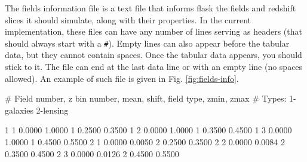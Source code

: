 \documentclass[12pt]{book} %
\newenvironment{alltt}{\ttfamily}{\par}
\begin{document}
The fields information file is a text file that informs {\sc flask} the fields and redshift 
slices it should simulate, along with their properties. In the current implementation, these 
files can have any number of lines serving as headers (that should always start with a {\tt \#}). 
Empty lines can also appear before the tabular data, but they cannot contain spaces. Once 
the tabular data appears, you should stick to it. The file can end at the last data line or 
with an empty line (no spaces allowed). An example of such file is given in Fig. \ref{fig:fields-info}.

\begin{alltt}
\begin{center}
\begin{boxedverbatim}
# Field number, z bin number, mean, shift, field type, zmin, zmax
# Types: 1-galaxies 2-lensing

     1      1   0.0000   1.0000      1   0.2500   0.3500
     1      2   0.0000   1.0000      1   0.3500   0.4500
     1      3   0.0000   1.0000      1   0.4500   0.5500
     2      1   0.0000   0.0050      2   0.2500   0.3500
     2      2   0.0000   0.0084      2   0.3500   0.4500
     2      3   0.0000   0.0126      2   0.4500   0.5500
\end{boxedverbatim}
\end{center}
\end{alltt}
\end{document}
